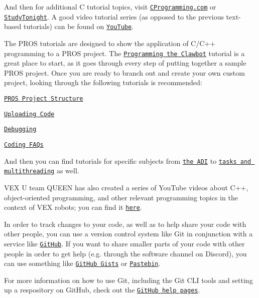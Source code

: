 And then for additional C tutorial topics, visit \href{https://www.cprogramming.com/tutorial/c-tutorial.html}{\tt C\+Programming.\+com} or \href{http://www.studytonight.com/c/overview-of-c.php}{\tt Study\+Tonight}. A good video tutorial series (as opposed to the previous text-\/based tutorials) can be found on \href{https://youtu.be/nXvy5900m3M}{\tt You\+Tube}.

The P\+R\+OS tutorials are designed to show the application of C/\+C++ programming to a P\+R\+OS project. The \href{../tutorials/walkthrough/clawbot.html}{\tt Programming the Clawbot} tutorial is a great place to start, as it goes through every step of putting together a sample P\+R\+OS project. Once you are ready to branch out and create your own custom project, looking through the following tutorials is recommended\+:


\begin{DoxyItemize}
\item \href{../tutorials/general/project-structure.html}{\tt P\+R\+OS Project Structure}
\item \href{../tutorials/walkthrough/uploading.html}{\tt Uploading Code}
\item \href{../tutorials/general/debugging.html}{\tt Debugging}
\item \href{./faq.html}{\tt Coding F\+A\+Qs}
\end{DoxyItemize}

And then you can find tutorials for specific subjects from \href{../tutorials/topical/adi.html}{\tt the A\+DI} to \href{../tutorials/topical/multitasking.html}{\tt tasks and multithreading} as well.

V\+EX U team Q\+U\+E\+EN has also created a series of You\+Tube videos about C++, object-\/oriented programming, and other relevant programming topics in the context of V\+EX robots; you can find it \href{https://www.youtube.com/playlist?list=PLxt0dHFRDpQhy24IL1wAniVq3xf8N7QAV}{\tt here}.

In order to track changes to your code, as well as to help share your code with other people, you can use a version control system like Git in conjunction with a service like \href{https://github.com}{\tt Git\+Hub}. If you want to share smaller parts of your code with other people in order to get help (e.\+g. through the software channel on Discord), you can use something like \href{https://gist.github.com}{\tt Git\+Hub Gists} or \href{https://pastebin.com}{\tt Pastebin}.

For more information on how to use Git, including the Git C\+LI tools and setting up a respository on Git\+Hub, check out the \href{https://help.github.com}{\tt Git\+Hub help pages}. 